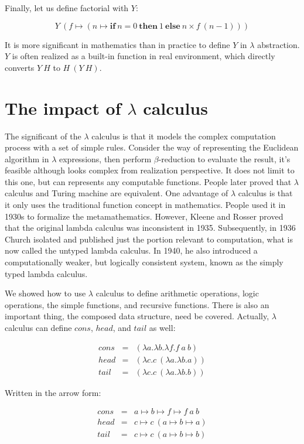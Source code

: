 \documentclass{article}
\begin{document}
Finally, let us define factorial with $Y$:

\[
Y\ (f \mapsto (n \mapsto \textbf{if}\ n = 0\ \textbf{then}\ 1\ \textbf{else}\ n \times f\ (n - 1)))
\]

It is more significant in mathematics than in practice to define $Y$ in $\lambda$ abstraction. $Y$ is often realized as a built-in function in real environment, which directly converts $Y\ H$ to $H\ (Y\ H)$.

\section{The impact of $\lambda$ calculus}

The significant of the $\lambda$ calculus is that it models the complex computation process with a set of simple rules. Consider the way of representing the Euclidean algorithm in $\lambda$ expressions, then perform $\beta$-reduction to evaluate the result, it's feasible although looks complex from realization perspective. It does not limit to this one, but can represents any computable functions. People later proved that $\lambda$ calculus and Turing machine are equivalent. One advantage of $\lambda$ calculus is that it only uses the traditional function concept in mathematics. People used it in 1930s to formalize the metamathematics. However, Kleene and Rosser proved that the original lambda calculus was inconsistent in 1935. Subsequently, in 1936 Church isolated and published just the portion relevant to computation, what is now called the untyped lambda calculus. In 1940, he also introduced a computationally weaker, but logically consistent system, known as the simply typed lambda calculus.

We showed how to use $\lambda$ calculus to define arithmetic operations, logic operations, the simple functions, and recursive functions. There is also an important thing, the composed data structure, need be covered. Actually, $\lambda$ calculus can define $cons$, $head$, and $tail$ as well:

\[
\begin{array}{rcl}
cons & = & (\lambda a . \lambda b . \lambda f . f\ a\ b) \\
head & = & (\lambda c . c\ (\lambda a . \lambda b . a)) \\
tail & = & (\lambda c . c\ (\lambda a . \lambda b . b))
\end{array}
\]

Written in the arrow form:

\[
\begin{array}{rcl}
cons & = & a \mapsto b \mapsto f \mapsto f\ a\ b \\
head & = & c \mapsto c\ (a \mapsto b \mapsto a) \\
tail & = & c \mapsto c\ (a \mapsto b \mapsto b)
\end{array}
\]
\end{document}
